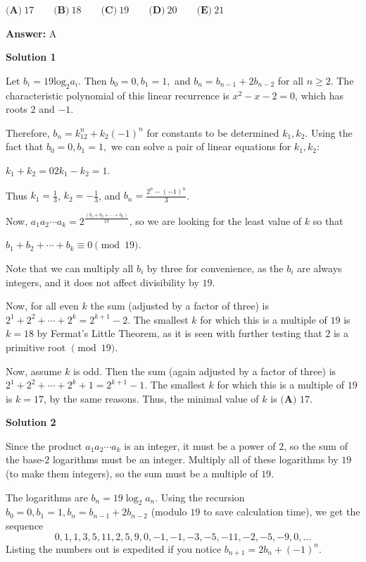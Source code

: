 \begin{enumerate}
 $\textbf{(A)}\ 17\qquad\textbf{(B)}\ 18\qquad\textbf{(C)}\ 19\qquad\textbf{(D)}\ 20\qquad\textbf{(E)}\ 21$

 \textbf{Answer: }A



\textbf{Solution 1}

Let $b_i=19\text{log}_2a_i$. Then $b_0=0, b_1=1,$ and $b_n=b_{n-1}+2b_{n-2}$ for all $n\geq 2$. The characteristic polynomial of this linear recurrence is $x^2-x-2=0$, which has roots $2$ and $-1$. 

 Therefore, $b_n=k_12^{n}+k_2(-1)^n$ for constants to be determined $k_1, k_2$.  Using the fact that $b_0=0, b_1=1,$ we can solve a pair of linear equations for $k_1, k_2$:

 $k_1+k_2=0$$2k_1-k_2=1$.

 Thus $k_1=\frac{1}{3}$, $k_2=-\frac{1}{3}$, and $b_n=\frac{2^n-(-1)^n}{3}$.

 Now, $a_1a_2\cdots a_k=2^{\frac{(b_1+b_2+\cdots+b_k)}{19}}$, so we are looking for the least value of $k$ so that

 $b_1+b_2+\cdots+b_k \equiv 0 \pmod{19}$. 

 Note that we can multiply all $b_i$ by three for convenience, as the $b_i$ are always integers, and it does not affect divisibility by $19$.

 Now, for all even $k$ the sum (adjusted by a factor of three) is $2^1+2^2+\cdots+2^k=2^{k+1}-2$. The smallest $k$ for which this is a multiple of $19$ is $k=18$ by Fermat's Little Theorem, as it is seen with further testing that $2$ is a primitive root $\pmod{19}$.  

 Now, assume $k$ is odd. Then the sum (again adjusted by a factor of three) is $2^1+2^2+\cdots+2^k+1=2^{k+1}-1$. The smallest $k$ for which this is a multiple of $19$ is $k=17$, by the same reasons. Thus, the minimal value of $k$ is $\boxed{\textbf{(A) } 17}$.

 



\textbf{Solution 2}

Since the product $a_1a_2\cdots a_k$ is an integer, it must be a power of $2$, so the sum of the base-$2$ logarithms must be an integer. Multiply all of these logarithms by $19$ (to make them integers), so the sum must be a multiple of $19$.

 The logarithms are $b_n = 19\log_2 a_n$. Using the recursion $b_0 = 0, b_1 = 1, b_n = b_{n-1}+2b_{n-2}$ (modulo $19$ to save calculation time), we get the sequence
 \[0,1,1,3,5,11,2,5,9,0,-1,-1,-3,-5,-11,-2,-5,-9,0,\dots\]Listing the numbers out is expedited if you notice $b_{n+1}=2b_n+(-1)^n$.


\end{enumerate}
